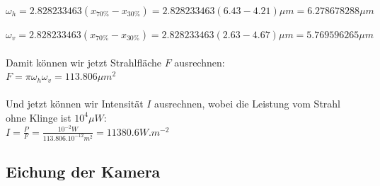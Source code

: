 \documentclass[12pt, a4paper]{article}
\begin{document}
  
  $\omega_h =2.828233463(x_{70\%}-x_{30\%})=2.828233463(6.43-4.21) \mu m=6.278678288  \mu m$ 
  
   $\omega_v =2.828233463(x_{70\%}-x_{30\%})=2.828233463(2.63-4.67) \mu m=5.769596265  \mu m$\\ \\
   Damit können wir jetzt Strahlfläche $F$ ausrechnen:\\
   
   $F=\pi \omega_h \omega_v =113.806 \mu m^2$\\ \\
   Und jetzt können wir Intensität $I$ ausrechnen, wobei die Leistung vom Strahl ohne Klinge ist $10^4 \mu W$:\\
   
   $I=\frac{P}{F}=\frac{10^{-2} W}{113.806 .10^{-12} m^2}=11380.6 W.m^{-2}$
  \subsection{Eichung der Kamera}
\end{document}
